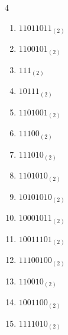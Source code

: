 \begin{multicols}{4}
\begin{enumerate}
        \phantom{$=87$}

  \item $11011011_{(2)}$

        \phantom{$=219$}

\columnbreak %

  \item $1100101_{(2)}$

        \phantom{$=101$}

  \item $111_{(2)}$

        \phantom{$=7$}

  \item $10111_{(2)}$

        \phantom{$=23$}

  \item $1101001_{(2)}$

        \phantom{$=105$}

  \item $11100_{(2)}$

        \phantom{$=28$}

  \item $111010_{(2)}$

        \phantom{$=58$}

  \item $1101010_{(2)}$

        \phantom{$=106$}

  \item $10101010_{(2)}$

        \phantom{$=170$}

  \item $10001011_{(2)}$

        \phantom{$=139$}

  \item $10011101_{(2)}$

        \phantom{$=157$}

  \item $11100100_{(2)}$

        \phantom{$=228$}

  \item $110010_{(2)}$

        \phantom{$=50$}

  \item $1001100_{(2)}$

        \phantom{$=76$}

  \item $1111010_{(2)}$


\end{enumerate}
\end{multicols}
